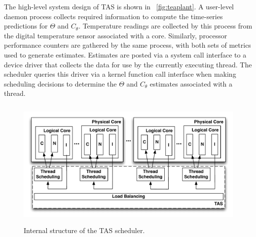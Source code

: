 \documentclass[times, 10pt,twocolumn]{IEEEtran}
\begin{document}
The high-level system design of TAS is shown in \figurename~\ref{fig:teaplant}.
A user-level daemon process collects required information to compute
the time-series predictions for $\Theta$ and $C_{\theta}$. Temperature
readings are collected by this process from the digital temperature
sensor associated with a core.  Similarly, processor performance
counters are gathered by the same process, with both sets of metrics
used to generate estimates. Estimates are posted via a system call
interface to a device driver that collects the data for use by
the currently executing thread.  The scheduler queries this
driver via a kernel function call interface when making scheduling
decisions to determine the $\Theta$ and $C_{\theta}$ estimates
associated with a thread.

\begin{figure}[t]
  \centering
  \includegraphics[width=1.0\linewidth,height=2.5in]{architecture}
  \caption{Internal structure of the TAS scheduler.}
  \label{fig:tasque}
\end{figure}
\end{document}
